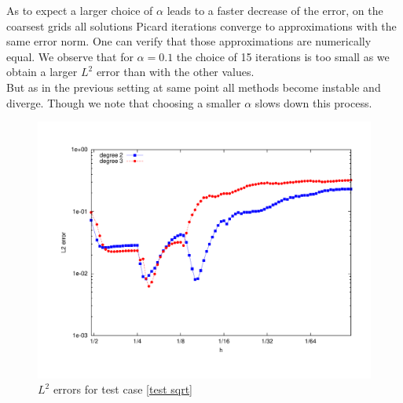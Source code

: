 As to expect a larger choice of $\alpha$ leads to a faster decrease of the error, on the coarsest grids all solutions Picard iterations converge to approximations with the same error norm. One can verify that those approximations are numerically equal. We observe that for $\alpha=0.1$ the choice of 15 iterations is too small as we obtain a larger $L^2$ error than with the other values.\\
But as in the previous setting at same point all methods become instable and diverge. Though we note that choosing a smaller $\alpha$ slows down this process. 

  \begin{figure}[H]
  	\centering
  	\includegraphics[scale =0.37]{plots/MA3.pdf}
  	\caption{$L^2$ errors for test case \ref{test sqrt}}
  	\label{fig: l2 errors test sqrt ourMethod}
  \end{figure}
  
